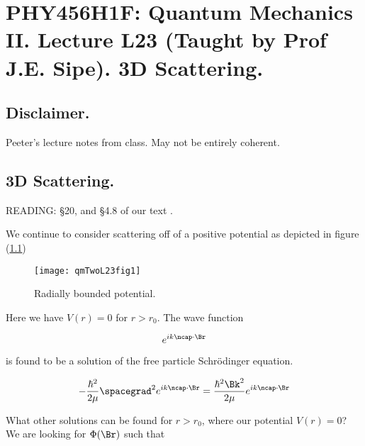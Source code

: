 
%

\chapter{PHY456H1F: Quantum Mechanics II.  Lecture L23 (Taught by Prof J.E. Sipe).  3D Scattering.}
\label{chap:qmTwoL23}
{}
\date{Nov 30, 2011}

\beginArtWithToc

\section{Disclaimer.}

Peeter's lecture notes from class.  May not be entirely coherent.

\section{3D Scattering.}

READING: \S 20, and \S 4.8 of our text \cite{desai2009quantum}.

We continue to consider scattering off of a positive potential as depicted in figure (\ref{fig:qmTwoL23:qmTwoL23fig1})
\begin{figure}[htp]
   \centering
   \texttt{[image: qmTwoL23fig1]}
   \caption{Radially bounded potential.}\label{fig:qmTwoL23:qmTwoL23fig1}
\end{figure}

Here we have $V(r) = 0$ for $r > r_0$.  The wave function

\begin{equation}\label{eqn:qmTwoL23:20}
e^{i k \ncap \cdot \Br}
\end{equation}

is found to be a solution of the free particle Schr\"{o}dinger equation.

\begin{equation}\label{eqn:qmTwoL23:40}
- \frac{\hbar^2}{2\mu} \spacegrad^2 
e^{i k \ncap \cdot \Br}
 = \frac{\hbar^2 \Bk^2}{2 \mu} 
e^{i k \ncap \cdot \Br}
\end{equation}

What other solutions can be found for $r > r_0$, where our potential $V(r) = 0$?  We are looking for $\Phi(\Br)$ such that

